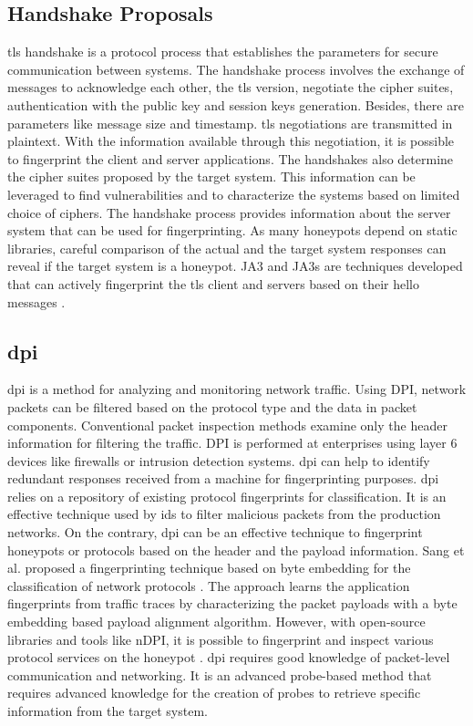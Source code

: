\subsection{Handshake Proposals}
\acrfull{tls} handshake is a protocol process that establishes the parameters for secure communication between systems. The handshake process involves the exchange of messages to acknowledge each other, the \acrshort{tls} version,  negotiate the cipher suites, authentication with the public key and session keys generation. Besides, there are parameters like message size and timestamp. \acrshort{tls} negotiations are transmitted in plaintext. With the information available through this negotiation, it is possible to fingerprint the client and server applications.  The handshakes also determine the cipher suites proposed by the target system. This information can be leveraged to find vulnerabilities and to characterize the systems based on limited choice of ciphers. The handshake process provides information about the server system that can be used for fingerprinting. As many honeypots depend on static libraries, careful comparison of the actual and the target system responses can reveal if the target system is a honeypot. 
JA3 and JA3s are techniques developed that can actively fingerprint the \acrshort{tls} client and servers based on their hello messages \cite{JA3}. 

\subsection{\acrfull{dpi}}
\acrfull{dpi}  is a method for analyzing and monitoring network traffic. Using DPI, network packets can be filtered based on the protocol type and the data in packet components. Conventional packet inspection methods examine only the header information for filtering the traffic. DPI is performed at enterprises using layer 6 devices like firewalls or intrusion detection systems. \acrshort{dpi} can help to identify redundant responses received from a machine for fingerprinting purposes. \acrshort{dpi} relies on a repository of existing protocol fingerprints for classification. It is an effective technique used by \acrshort{ids} to filter malicious packets from the production networks. On the contrary, \acrshort{dpi} can be an effective technique to fingerprint honeypots or protocols based on the header and the payload information. Sang et al. proposed a fingerprinting technique based on byte embedding for the classification of network protocols \cite{Sang}. The approach learns the application fingerprints from traffic traces by characterizing the packet payloads with a byte embedding based payload alignment algorithm. However, with open-source libraries and tools like nDPI, it is possible to fingerprint and inspect various protocol services on the honeypot \cite{nDPI}. \acrshort{dpi} requires good knowledge of packet-level communication and networking. It is an advanced probe-based method that requires advanced knowledge for the creation of probes to retrieve specific information from the target system.  


